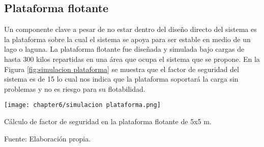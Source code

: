 \subsection{Plataforma flotante}

Un componente clave a pesar de no estar dentro del diseño directo del sistema es la plataforma sobre la cual el sistema se apoya para ser estable en medio de un lago o laguna. La plataforma flotante fue diseñada y simulada bajo cargas de hasta 300 kilos repartidas en una área que ocupa el sistema que se propone. En la Figura \ref{fig:simulacion plataforma} se muestra que el factor de seguridad del sistema es de 15 lo cual nos indica que la plataforma soportará la carga sin problemas y no es riesgo para su flotabilidad.

\begin{myfigure}[H]
	\footnotesize\centering
	\texttt{[image: chapter6/simulacion plataforma.png]}
	\caption{Cálculo de factor de seguridad en la plataforma flotante de 5x5 m.}
	\begin{myflushcenter}
		Fuente: Elaboración propia.
	\end{myflushcenter}
	\label{fig:simulacion plataforma}
\end{myfigure}





